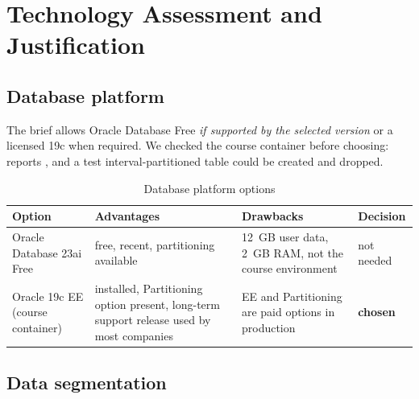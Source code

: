 \chapter{Technology Assessment and Justification}\label{ch:technology}

\section{Database platform}

The brief allows Oracle Database Free \emph{if supported by the selected version} or a
licensed 19c when required. We checked the course container before choosing:
 reports , and a test interval-partitioned table
could be created and dropped.

\begin{table}[H]
\centering
\caption{Database platform options}
\begin{tabularx}{\linewidth}{>{\raggedright\arraybackslash}p{3.4cm}LL>{\raggedright\arraybackslash}p{2.1cm}}
\toprule
Option & Advantages & Drawbacks & Decision \\
\midrule
Oracle Database 23ai Free & free, recent, partitioning available & 12~GB user data, 2~GB RAM, not the course environment & not needed \\
Oracle 19c EE (course container) & installed, Partitioning option present, long-term support release used by most companies & EE and Partitioning are paid options in production & \textbf{chosen} \\
\bottomrule
\end{tabularx}
\end{table}

\section{Data segmentation}


